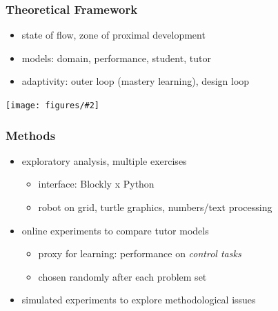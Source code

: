 \documentclass[bigger]{beamer}
\newcommand{\img}[2]{
  \begin{center}
    \texttt{[image: figures/\#2]}
  \end{center}
}
\begin{document}
\begin{frame}
  \frametitle{Theoretical Framework}

  \begin{itemize}
  \item state of flow, zone of proximal development

  \item models: domain, performance, student, tutor

  \item adaptivity: outer loop (mastery learning), design loop %
  \end{itemize}

  \img{0.9}{robomission-tutor-model}

\end{frame}


\begin{frame}
  \frametitle{Methods}

  \begin{itemize}
  \item exploratory analysis, multiple exercises
    \begin{itemize}
    \item interface: Blockly x Python
    \item robot on grid, turtle graphics, numbers/text processing
    \end{itemize}

  \item online experiments to compare tutor models
    \begin{itemize}
    \item proxy for learning: performance on \emph{control tasks}
    \item chosen randomly after each problem set
    \end{itemize}

  \item simulated experiments to explore methodological issues
  \end{itemize}

\end{frame}
\end{document}
